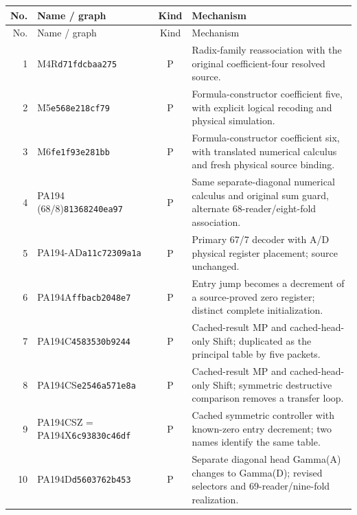 \begingroup\footnotesize
\begin{longtable}{@{}rp{}cp{}@{}}
\toprule No. & Name / graph & Kind & Mechanism\\\midrule\endfirsthead
\toprule No. & Name / graph & Kind & Mechanism\\\midrule\endhead
1 & M4R\newline\texttt{d71fdcbaa275} & P & Radix-family reassociation with the original coefficient-four resolved source.\\[5pt]
2 & M5\newline\texttt{e568e218cf79} & P & Formula-constructor coefficient five, with explicit logical recoding and physical simulation.\\[5pt]
3 & M6\newline\texttt{fe1f93e281bb} & P & Formula-constructor coefficient six, with translated numerical calculus and fresh physical source binding.\\[5pt]
4 & PA194 (68/8)\newline\texttt{81368240ea97} & P & Same separate-diagonal numerical calculus and original sum guard, alternate 68-reader/eight-fold association.\\[5pt]
5 & PA194-AD\newline\texttt{a11c72309a1a} & P & Primary 67/7 decoder with A/D physical register placement; source unchanged.\\[5pt]
6 & PA194A\newline\texttt{ffbacb2048e7} & P & Entry jump becomes a decrement of a source-proved zero register; distinct complete initialization.\\[5pt]
7 & PA194C\newline\texttt{4583530b9244} & P & Cached-result MP and cached-head-only Shift; duplicated as the principal table by five packets.\\[5pt]
8 & PA194CS\newline\texttt{e2546a571e8a} & P & Cached-result MP and cached-head-only Shift; symmetric destructive comparison removes a transfer loop.\\[5pt]
9 & PA194CSZ = PA194X\newline\texttt{6c93830c46df} & P & Cached symmetric controller with known-zero entry decrement; two names identify the same table.\\[5pt]
10 & PA194D\newline\texttt{d5603762b453} & P & Separate diagonal head Gamma(A) changes to Gamma(D); revised selectors and 69-reader/nine-fold realization.\\[5pt]

\end{longtable}
